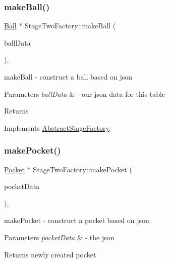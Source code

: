 \subsubsection{\texorpdfstring{make\+Ball()}{makeBall()}}
{\footnotesize\ttfamily \mbox{\hyperlink{class_ball}{Ball}} $\ast$ Stage\+Two\+Factory\+::make\+Ball (\begin{DoxyParamCaption}\item[{const Q\+Json\+Object \&}]{ball\+Data }\end{DoxyParamCaption})\hspace{0.3cm}{\ttfamily [override]}, {\ttfamily [virtual]}}



make\+Ball -\/ construct a ball based on json 


\begin{DoxyParams}{Parameters}
{\em ball\+Data} & -\/ our json data for this table \\
\hline
\end{DoxyParams}
\begin{DoxyReturn}{Returns}

\end{DoxyReturn}


Implements \mbox{\hyperlink{class_abstract_stage_factory_a23367d64366e679aaff865620f5ce1ab}{Abstract\+Stage\+Factory}}.

\mbox{\label{class_stage_two_factory_a6b66c413691103cf5df2840bcdb683ef}} 
\subsubsection{\texorpdfstring{make\+Pocket()}{makePocket()}}
{\footnotesize\ttfamily \mbox{\hyperlink{class_pocket}{Pocket}} $\ast$ Stage\+Two\+Factory\+::make\+Pocket (\begin{DoxyParamCaption}\item[{const Q\+Json\+Object \&}]{pocket\+Data }\end{DoxyParamCaption})\hspace{0.3cm}{\ttfamily [override]}, {\ttfamily [virtual]}}



make\+Pocket -\/ construct a pocket based on json 


\begin{DoxyParams}{Parameters}
{\em pocket\+Data} & -\/ the json \\
\hline
\end{DoxyParams}
\begin{DoxyReturn}{Returns}
newly created pocket 
\end{DoxyReturn}


